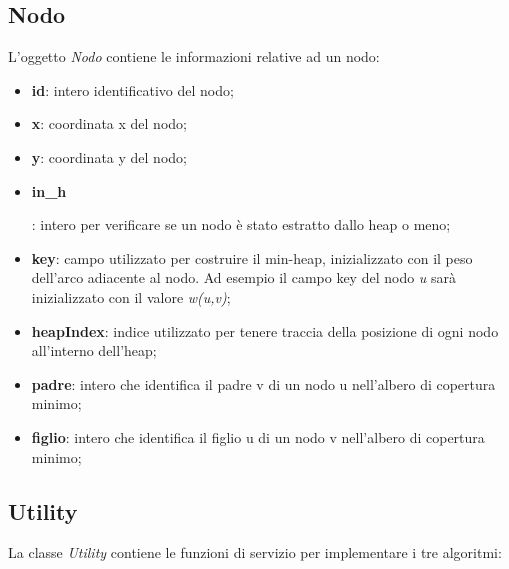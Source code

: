 
\subsection{Nodo}
\label{nodo}

L'oggetto \textit{Nodo} contiene le informazioni relative ad un nodo:

\begin{itemize}
    \item \textbf{id}: intero identificativo del nodo;
    \item \textbf{x}: coordinata x del nodo;
    \item \textbf{y}: coordinata y del nodo;
    \item \hypertarget{inh}{\textbf{in\_h}}: intero per verificare se un nodo è stato estratto dallo heap o meno;
    \item \textbf{key}: campo utilizzato per costruire il min-heap, inizializzato con il peso dell'arco adiacente al nodo. Ad esempio il campo key del nodo \emph{u} sarà inizializzato con il valore \emph{w(u,v)};
    \item \textbf{heapIndex}: indice utilizzato per tenere traccia della posizione di ogni nodo all'interno dell'heap;
    \item \textbf{padre}: intero che identifica il padre v di un nodo u nell'albero di copertura minimo;
    \item \textbf{figlio}: intero che identifica il figlio u di un nodo v nell'albero di copertura minimo;
\end{itemize}


\subsection{Utility}
\label{utility}

La classe \textit{Utility} contiene le funzioni di servizio per implementare i tre algoritmi:

